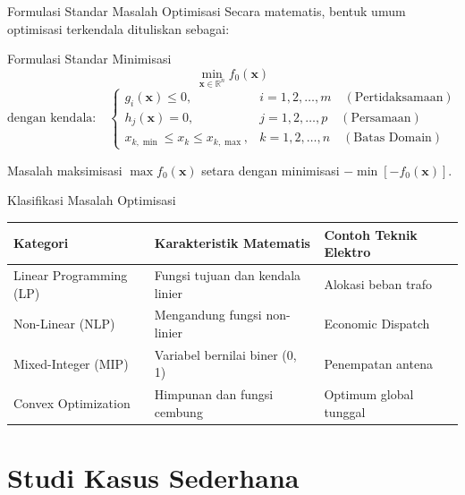 \documentclass[10pt,aspectratio=169]{beamer}
\newcommand{\R}{\mathbb{R}}
\begin{document}
\begin{frame}{Formulasi Standar Masalah Optimisasi}
    Secara matematis, bentuk umum optimisasi terkendala dituliskan sebagai:
    \begin{block}{Formulasi Standar Minimisasi}
        \[
            \min_{\mathbf{x} \in \R^n} f_0(\mathbf{x})
        \]
        \[
            \text{dengan kendala:} \quad
            \begin{cases}
                g_i(\mathbf{x}) \le 0, & i = 1, 2, \dots, m \quad (\text{Pertidaksamaan}) \\
                h_j(\mathbf{x}) = 0, & j = 1, 2, \dots, p \quad (\text{Persamaan}) \\
                x_{k,\min} \le x_k \le x_{k,\max}, & k = 1, 2, \dots, n \quad (\text{Batas Domain})
            \end{cases}
        \]
    \end{block}

    \begin{tcolorbox}[colback=white,colframe=unibblue,title=\textbf{Catatan Penting}]
        Masalah maksimisasi $\max f_0(\mathbf{x})$ setara dengan minimisasi $-\min [-f_0(\mathbf{x})]$.
    \end{tcolorbox}
\end{frame}

\begin{frame}{Klasifikasi Masalah Optimisasi}
    \begin{table}
        \centering
        \small
        \begin{tabular}{p{3.5cm}p{5.5cm}p{4cm}}
            \toprule
            \textbf{Kategori} & \textbf{Karakteristik Matematis} & \textbf{Contoh Teknik Elektro} \\
            \midrule
            Linear Programming (LP) & Fungsi tujuan dan kendala linier & Alokasi beban trafo \\
            Non-Linear (NLP) & Mengandung fungsi non-linier & Economic Dispatch \\
            Mixed-Integer (MIP) & Variabel bernilai biner (0, 1) & Penempatan antena \\
            Convex Optimization & Himpunan dan fungsi cembung & Optimum global tunggal \\
            \bottomrule
        \end{tabular}
    \end{table}
\end{frame}

\section{Studi Kasus Sederhana}
\end{document}
